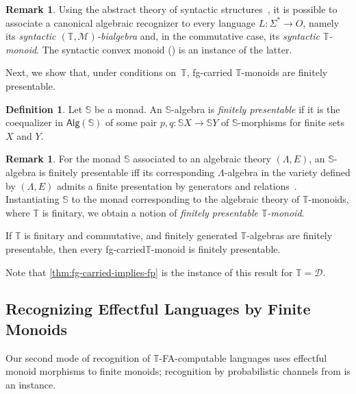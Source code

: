 \documentclass[a4paper, UKenglish, numberwithinsect, thm-restate, cleveref, final]{lipics-v2021}
\theoremstyle{plain}
\theoremstyle{definition}
\newtheorem{defn}[theorem]{Definition} \newtheorem{expl}[theorem]{Example} \newtheorem{rem}[theorem]{Remark} \newtheorem{notn}[theorem]{Notation} \newtheorem{assumption}[theorem]{Assumption}
\newcommand{\finite}{fg-carried\xspace}
\newcommand{\T}{\ensuremath{\mathbb{T}}\xspace}
\newcommand{\M}{\ensuremath{\mathcal{M}}\xspace}
\newcommand{\D}{\ensuremath{\mathcal{D}}}
\newcommand{\Alg}{\ensuremath{\mathsf{Alg}}}
\numberwithin{equation}{section}
\begin{document}
\begin{rem}
Using the abstract theory of syntactic structures~\cite{Bojan15,uacm17,amu18}, it is possible to associate a canonical algebraic recognizer to every language $L\colon \Sigma^*\to O$, namely its \emph{syntactic $(\T,\M)$-bialgebra} and, in the commutative case, its \emph{syntactic $\T$-monoid}. The syntactic convex monoid () is an instance of the latter.
\end{rem}



Next, we show that, under conditions on~$\T$, fg-carried $\T$-monoids are finitely presentable.

\begin{defn}
Let $\mathbb{S}$ be a monad. An $\mathbb{S}$-algebra is \emph{finitely presentable} if it is the coequalizer in $\Alg(\mathbb{S})$ of some pair $p,q\colon \mathbb{S} X\to \mathbb{S} Y$ of $\mathbb{S}$-morphisms for finite sets $X$ and $Y$.
\end{defn}

\begin{rem}
For the monad $\mathbb{S}$ associated to an algebraic theory $(\Lambda,E)$, an $\mathbb{S}$-algebra is finitely presentable iff its corresponding $\Lambda$-algebra in the variety defined by $(\Lambda,E)$ admits a finite presentation by generators and relations~\cite[Prop.~11.28]{arv10}. Instantiating $\mathbb{S}$ to the monad corresponding to the algebraic theory of $\T$-monoids, where $\T$ is finitary, we obtain a notion of \emph{finitely presentable $\T$-monoid}.
\end{rem}

\begin{theorem}\label{thm:fg-carried-implies-fp-general}
If $\T$ is finitary and commutative, and finitely generated $\T$-algebras are finitely presentable, then every \finite $\T$-monoid is finitely presentable.
\end{theorem}
Note that \cref{thm:fg-carried-implies-fp} is the instance of this result for $\T = \D$.




\subsection{Recognizing Effectful Languages by Finite Monoids}
\label{sec:kleisli-rec}
Our second mode of recognition of \T-FA-computable languages uses effectful monoid morphisms to finite monoids; recognition by probabilistic channels from  is an instance.
\end{document}
